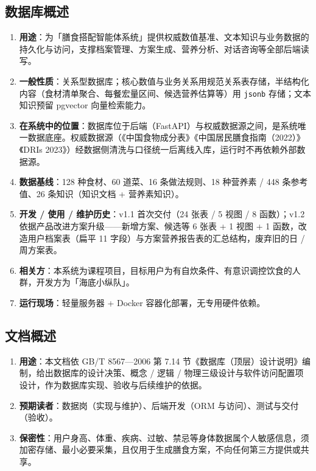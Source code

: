 \documentclass[12pt,a4paper]{ctexart}
\begin{document}
\subsection{数据库概述}

\begin{enumerate}
\item \textbf{用途}：为「膳食搭配智能体系统」提供权威数值基准、文本知识与业务数据的持久化与访问，支撑档案管理、方案生成、营养分析、对话咨询等全部后端读写。
\item \textbf{一般性质}：关系型数据库；核心数值与业务关系用规范关系表存储，半结构化内容（食材清单聚合、每餐宏量区间、候选营养估算等）用 \texttt{jsonb} 存储；文本知识预留 pgvector 向量检索能力。
\item \textbf{在系统中的位置}：数据库位于后端（FastAPI）与权威数据源之间，是系统唯一数据底座。权威数据源（《中国食物成分表》《中国居民膳食指南（2022）》《DRIs 2023》）经数据侧清洗与口径统一后离线入库，运行时不再依赖外部数据源。
\item \textbf{数据基线}：128 种食材、60 道菜、16 条做法规则、18 种营养素 / 448 条参考值、26 条知识（知识文档 + 营养素知识）。
\item \textbf{开发 / 使用 / 维护历史}：v1.1 首次交付（24 张表 / 5 视图 / 8 函数）；v1.2 依据产品改进方案升级——新增方案、候选等 6 张表 + 1 视图 + 1 函数，改造用户档案表（扁平 11 字段）与方案营养报告表的汇总结构，废弃旧的日 / 周方案表。
\item \textbf{相关方}：本系统为课程项目，目标用户为有自炊条件、有意识调控饮食的人群，开发方为「海底小纵队」。
\item \textbf{运行现场}：轻量服务器 + Docker 容器化部署，无专用硬件依赖。
\end{enumerate}

\subsection{文档概述}

\begin{enumerate}
\item \textbf{用途}：本文档依 GB/T 8567---2006 第 7.14 节《数据库（顶层）设计说明》编制，给出数据库的设计决策、概念 / 逻辑 / 物理三级设计与软件访问配置项设计，作为数据库实现、验收与后续维护的依据。
\item \textbf{预期读者}：数据岗（实现与维护）、后端开发（ORM 与访问）、测试与交付（验收）。
\item \textbf{保密性}：用户身高、体重、疾病、过敏、禁忌等身体数据属个人敏感信息，须加密存储、最小必要采集，且仅用于生成膳食方案，不向任何第三方提供或共享。
\end{enumerate}
\end{document}
